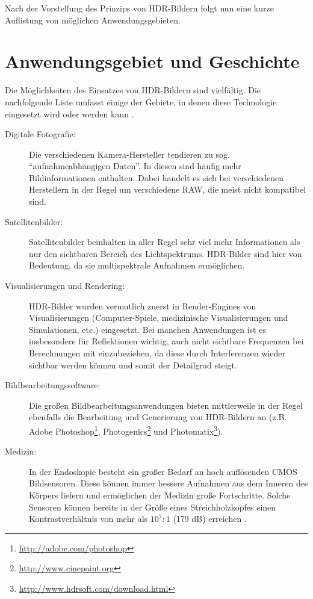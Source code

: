 Nach der Vorstellung des Prinzips von \gls{HDR}-Bildern folgt nun eine kurze Auflistung von möglichen Anwendungsgebieten.


\section{Anwendungsgebiet und Geschichte}

Die Möglichkeiten des Einsatzes von \gls{HDR}-Bildern sind vielfältig. Die nachfolgende Liste umfasst einige der Gebiete, in denen diese Technologie eingesetzt wird oder werden kann \cite[S.~87f]{Reinhard}.

\begin{description}

\item[Digitale Fotografie:] Die verschiedenen Kamera-Hersteller tendieren zu sog.  \enquote{aufnahmeabhängigen Daten}. In diesen sind häufig mehr Bildinformationen enthalten. Dabei handelt es sich bei verschiedenen Herstellern in der Regel um verschiedene \acrfull{RAW}, die meist nicht kompatibel sind. 

\item[Satellitenbilder:] Satellitenbilder beinhalten in aller Regel sehr viel mehr Informationen als nur den sichtbaren Bereich des Lichtspektrums. \gls{HDR}-Bilder sind hier von Bedeutung, da sie multispektrale Aufnahmen ermöglichen.

\item[Visualisierungen und Rendering:] \gls{HDR}-Bilder wurden vermutlich zuerst in Render-Engines von Visualisierungen (Computer-Spiele, medizinische Visualisierungen und Simulationen, etc.) eingesetzt. Bei manchen Anwendungen ist es insbesondere für Reflektionen wichtig, auch nicht sichtbare Frequenzen bei Berechnungen mit einzubeziehen, da diese durch Interferenzen wieder sichtbar werden können und somit der Detailgrad steigt.

\item[Bildbearbeitungssoftware:] Die großen Bildbearbeitungsanwendungen bieten mittlerweile in der Regel ebenfalls die Bearbeitung und Generierung von \gls{HDR}-Bildern an (z.B. Adobe Photoshop\footnote{\url{http://adobe.com/photoshop}}, Photogenics\footnote{\url{http://www.cinepaint.org}} und Photomatix\footnote{\url{http://www.hdrsoft.com/download.html}}).

\item[Medizin:] In der Endoskopie besteht ein großer Bedarf an hoch auflösenden \gls{CMOS} Bildsensoren. Diese können immer bessere Aufnahmen aus dem Inneren des Körpers liefern und ermöglichen der Medizin große Fortschritte. Solche Sensoren können bereits in der Größe eines Streichholzkopfes einen Kontrastverhältnis von mehr als $10^7:1$ (179 dB) erreichen \cite{Klingler_Richter_Strobel_2006}.


\end{description}
